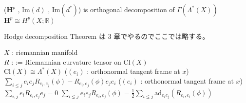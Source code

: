 \begin{Theorem}
\itemprop
  (\(\mathbf{H}^p\) , \(\text{Im}(d)\) , \(\text{Im}(d^*)\)) is orthogonal decomposition of \(\Gamma(\Lambda^*(X))\)
\itemprof
  \(\mathbf{H}^p \cong H^p(X ; \mathbb{R})\)
\end{Theorem}

\begin{Proof}
\itemprof
  Hodge decomposition Theorem は 3 章でやるのでここでは略する。
\end{Proof}

\begin{Theorem}
\itemwhen
  \Fix \(X\) : riemannian manifold \\
  \Let \(R\) : := Riemannian curvature tensor on \(\text{Cl}(X)\) \\
  \Fix \(\text{Cl}(X) \cong \Lambda^*(X)\)
\itemprop
  \For (\((e_i)\) : orthonormal tangent frame at \(x\)) \\
  \Then \(\sum_{i \lneq j} e_i e_j R_{e_i , e_j}(\phi) - R_{e_i , e_j}(\phi) e_j e_i\)
\itemprop
  \For (\((e_i)\) : orthonormal tangent frame at \(x\)) \\
  \Then \(\sum_{i,j} e_i R_{e_i , e_j} e_j = 0\)
\itemprop
  \(\sum_{i \lneq j} e_i e_j R_{e_i , e_j} (\phi) = \frac{1}{2} \sum_{i \lneq j} \text{ad}_{e_i e_j}(R_{e_i , e_i} (\phi))\)
\end{Theorem}

